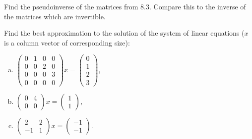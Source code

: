\begin{problem}
Find the pseudoinverse of the matrices from 8.3. Compare this to the inverse of the matrices which are invertible.
\end{problem}

\begin{problem}
Find the best approximation to the solution of the system of linear equations ($x$ is a column vector of corresponding size):
\begin{enumerate}[a) ]
    \item $\begin{pmatrix}
        0 & 1 & 0 & 0 \\
        0 & 0 & 2 & 0 \\
        0 & 0 & 0 & 3 \\
        0 & 0 & 0 & 0
        \end{pmatrix}x = \begin{pmatrix}
        0 \\ 1 \\ 2 \\ 3
        \end{pmatrix}$,
\item $\begin{pmatrix}
            0 & 4 \\
            0 & 0
            \end{pmatrix}x = \begin{pmatrix}
            1 \\ 1
            \end{pmatrix}$,
\item $\begin{pmatrix}
                2 & 2 \\
                -1 & 1
                \end{pmatrix}x = \begin{pmatrix}
                -1 \\ -1
                \end{pmatrix}$.
\end{enumerate}
\end{problem}